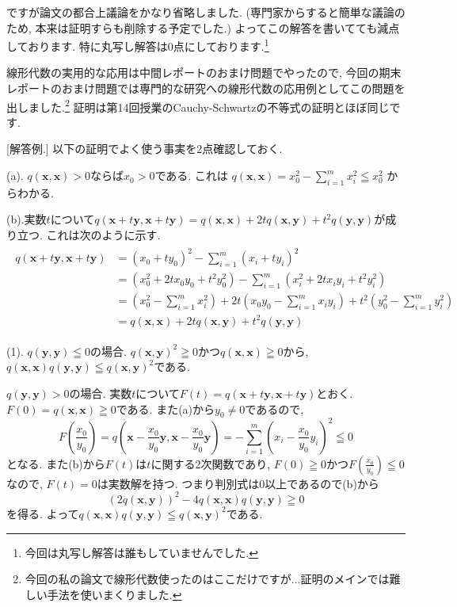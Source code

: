 \documentclass[dvipdfmx,a4paper,11pt]{article}
\theoremstyle{definition}
\begin{document}
 
ですが論文の都合上議論をかなり省略しました. (専門家からすると簡単な議論のため, 本来は証明すらも削除する予定でした.) 
よってこの解答を書いてても減点しております. 特に丸写し解答は0点にしております.\footnote{今回は丸写し解答は誰もしていませんでした.}

線形代数の実用的な応用は中間レポートのおまけ問題でやったので, 今回の期末レポートのおまけ問題では専門的な研究への線形代数の応用例としてこの問題を出しました.\footnote{今回の私の論文で線形代数使ったのはここだけですが...証明のメインでは難しい手法を使いまくりました.}
証明は第14回授業のCauchy-Schwartzの不等式の証明とほぼ同じです.

[解答例.]
以下の証明でよく使う事実を2点確認しておく.

(a). $q(\bm{x},\bm{x})>0$ならば$x_0 >0$である.
これは
$q(\bm{x},\bm{x}) = x_{0}^2 - \sum_{i=1}^{m} x_{i}^2  \leqq x_{0}^2 $
からわかる.

(b).実数$t$について$q(\bm{x}+t\bm{y}, \bm{x}+t\bm{y}) = q(\bm{x},\bm{x})+2tq(\bm{x},\bm{y}) + t^2q(\bm{y},\bm{y})$が成り立つ. これは次のように示す.
\begin{align*}
\begin{split}
q(\bm{x}+t\bm{y}, \bm{x}+t\bm{y})
& = (x_0 + t y_0)^2 - \sum_{i=1}^{m}(x_i+ t y_i)^2  \\
&= ( x_{0}^2 + 2tx_0 y_0 + t^2 y_{0}^2) - \sum_{i=1}^{m}\left( x_{i}^2+2t x_i y_i+ t^2 y_{i}^2   \right) \\
&= ( x_{0}^2 - \sum_{i=1}^{m} x_{i}^2) + 2t (x_0 y_0 - \sum_{i=1}^{m} x_i y_i ) 
+ t^2 (y_{0}^2 - \sum_{i=1}^{m} y_{i}^2) \\
&= q(\bm{x},\bm{x})+2tq(\bm{x},\bm{y}) + t^2q(\bm{y},\bm{y})
 \end{split}
\end{align*}

(1). $q(\bm{y},\bm{y}) \leqq0$の場合. $q(\bm{x} , \bm{y} )^2 \geqq 0$かつ$q(\bm{x} , \bm{x} ) \geqq 0$から, 
$q(\bm{x} , \bm{x})q(\bm{y} , \bm{y}) \leqq q(\bm{x},\bm{y})^2$である.

$q(\bm{y},\bm{y}) > 0$の場合. 実数$t$について$F(t) = q(\bm{x}+t\bm{y} , \bm{x}+t\bm{y} )$とおく. 
$F(0) = q(\bm{x} , \bm{x} ) \geqq 0$である. また(a)から$y_0 \neq 0$であるので, 
$$
F\left(\frac{x_0}{y_0}\right) = q\left(\bm{x} - \frac{x_0}{y_0}\bm{y} ,  \bm{x} - \frac{x_0}{y_0}\bm{y} \right) 
= - \sum_{i=1}^{m}\left(x_i - \frac{x_0}{y_0} y_i\right)^2  \leqq 0
$$
となる.
また(b)から$F(t)$は$t$に関する2次関数であり, $F(0)\geqq 0$かつ$F\left(\frac{x_0}{y_0}\right) \leqq 0$なので, $F(t)=0$は実数解を持つ.
つまり判別式は0以上であるので(b)から
$$
(2q(\bm{x},\bm{y}))^2 - 4q(\bm{x},\bm{x})q(\bm{y},\bm{y})\geqq0
$$
を得る. よって$q(\bm{x} , \bm{x})q(\bm{y} , \bm{y}) \leqq q(\bm{x},\bm{y})^2$である.
\end{document}
